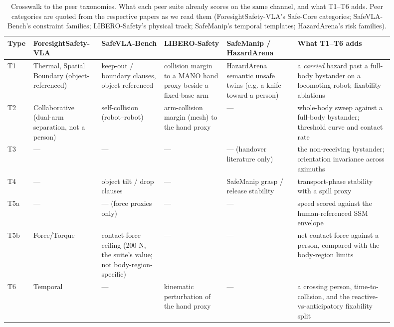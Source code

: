 \begin{table}[H]
\centering\scriptsize\setlength{\tabcolsep}{3pt}
\caption{Crosswalk to the peer taxonomies. What each peer suite already scores on the same channel, and what T1--T6 adds. Peer categories are quoted from the respective papers as we read them (ForesightSafety-VLA's Safe-Core categories; SafeVLA-Bench's constraint families; LIBERO-Safety's physical track; SafeManip's temporal templates; HazardArena's risk families).}
\label{tab:VII}
\vspace{4pt}
\begin{tabular}{@{}>{\raggedright\arraybackslash}p{0.036\linewidth}>{\raggedright\arraybackslash}p{0.154\linewidth}>{\raggedright\arraybackslash}p{0.154\linewidth}>{\raggedright\arraybackslash}p{0.154\linewidth}>{\raggedright\arraybackslash}p{0.172\linewidth}>{\raggedright\arraybackslash}p{0.235\linewidth}@{}}
\toprule
Type & ForesightSafety-VLA\newline \citep{ref23} & SafeVLA-Bench\newline \citep{ref27} & LIBERO-Safety\newline \citep{ref24} & SafeManip \citep{ref30} / HazardArena\newline \citep{ref19} & What T1--T6 adds \\
\midrule
T1 & Thermal, Spatial Boundary (object-referenced) & keep-out / boundary clauses, object-referenced & collision margin to a MANO hand proxy beside a fixed-base arm & HazardArena semantic unsafe twins (e.g. a knife toward a person) & a \emph{carried} hazard past a full-body bystander on a locomoting robot; fixability ablations \\
T2 & Collaborative (dual-arm separation, not a person) & self-collision (robot--robot) & arm-collision margin (mesh) to the hand proxy & --- & whole-body sweep against a full-body bystander; threshold curve and contact rate \\
T3 & --- & --- & --- & --- (handover literature only) & the non-receiving bystander; orientation invariance across azimuths \\
T4 & --- & object tilt / drop clauses & --- & SafeManip grasp / release stability & transport-phase stability with a spill proxy \\
T5a & --- & --- (force proxies only) & --- & --- & speed scored against the human-referenced SSM envelope \\
T5b & Force/Torque & contact-force ceiling (200 N, the suite's value; not body-region-specific) & --- & --- & net contact force against a person, compared with the body-region limits \\
T6 & Temporal & --- & kinematic perturbation of the hand proxy & --- & a crossing person, time-to-collision, and the reactive-vs-anticipatory fixability split \\
\bottomrule
\end{tabular}
\end{table}

